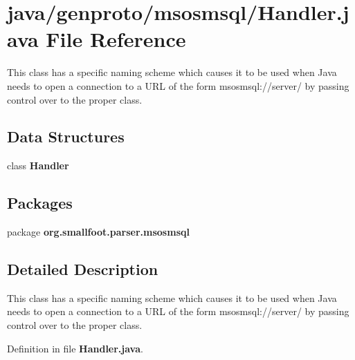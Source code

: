 \section{java/genproto/msosmsql/\+Handler.java File Reference}
\label{genproto_2msosmsql_2Handler_8java}


This class has a specific naming scheme which causes it to be used when Java needs to open a connection to a U\+R\+L of the form msosmsql\+://server/ by passing control over to the proper class.  


\subsection*{Data Structures}
\begin{DoxyCompactItemize}
\item 
class {\bf Handler}
\end{DoxyCompactItemize}
\subsection*{Packages}
\begin{DoxyCompactItemize}
\item 
package {\bf org.\+smallfoot.\+parser.\+msosmsql}
\end{DoxyCompactItemize}


\subsection{Detailed Description}
This class has a specific naming scheme which causes it to be used when Java needs to open a connection to a U\+R\+L of the form msosmsql\+://server/ by passing control over to the proper class. 



Definition in file {\bf Handler.\+java}.

